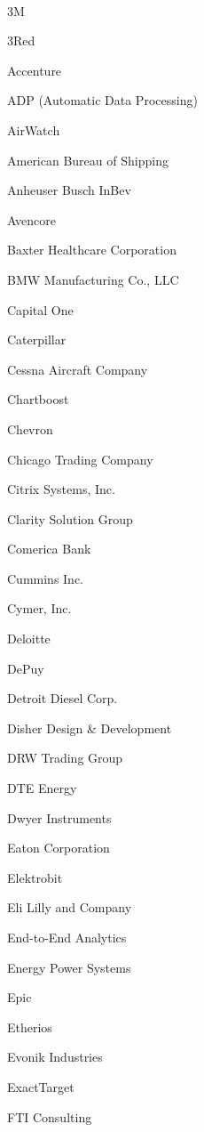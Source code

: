\documentclass[twoside]{article}
\begin{document}
\begin{center}
\begin{multicols}{5}
        \vspace{-1em}
        ~\hrulefill~
        \vspace{-.9em}
        \begin{FlushLeft}
        \begin{compactitem}
        \item 3M
\item 3Red
\item Accenture
\item ADP (Automatic Data Processing)
\item AirWatch
\item American Bureau of Shipping
\item Anheuser Busch InBev
\item Avencore
\item Baxter Healthcare Corporation
\item BMW Manufacturing Co., LLC
\item Capital One
\item Caterpillar
\item Cessna Aircraft Company
\item Chartboost
\item Chevron
\item Chicago Trading Company
\item Citrix Systems, Inc.
\item Clarity Solution Group
\item Comerica Bank
\item Cummins Inc.
\item Cymer, Inc.
\item Deloitte
\item DePuy
\item Detroit Diesel Corp.
\item Disher Design \& Development
\item DRW Trading Group
\item DTE Energy
\item Dwyer Instruments
\item Eaton Corporation
\item Elektrobit
\item Eli Lilly and Company
\item End-to-End Analytics
\item Energy Power Systems
\item Epic
\item Etherios
\item Evonik Industries
\item ExactTarget
\item FTI Consulting

\end{compactitem}
\end{FlushLeft}
\end{multicols}
\end{center}
\end{document}
